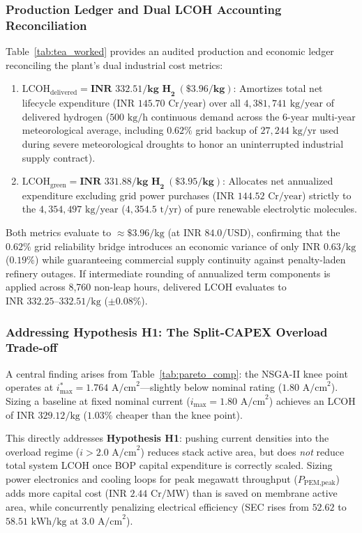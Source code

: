 \documentclass[conference]{IEEEtran}
\begin{document}
\subsubsection{Production Ledger and Dual LCOH Accounting Reconciliation}
Table~\ref{tab:tea_worked} provides an audited production and economic ledger reconciling the plant's dual industrial cost metrics:
\begin{enumerate}
    \item $\text{LCOH}_{\text{delivered}} = \mathbf{\text{INR } 332.51/\text{kg H}_2}\ (\mathbf{\$3.96/\text{kg}})$: Amortizes total net lifecycle expenditure ($\text{INR } 145.70\text{ Cr/year}$) over all $4,381,741\text{ kg/year}$ of delivered hydrogen ($500\text{ kg/h}$ continuous demand across the 6-year multi-year meteorological average, including $0.62\%$ grid backup of $27,244\text{ kg/yr}$ used during severe meteorological droughts to honor an uninterrupted industrial supply contract).
    \item $\text{LCOH}_{\text{green}} = \mathbf{\text{INR } 331.88/\text{kg H}_2}\ (\mathbf{\$3.95/\text{kg}})$: Allocates net annualized expenditure excluding grid power purchases ($\text{INR } 144.52\text{ Cr/year}$) strictly to the $4,354,497\text{ kg/year}$ ($4,354.5\text{ t/yr}$) of pure renewable electrolytic molecules.
\end{enumerate}
Both metrics evaluate to $\approx \$3.96/\text{kg}$ (at $\text{INR } 84.0/\text{USD}$), confirming that the $0.62\%$ grid reliability bridge introduces an economic variance of only $\text{INR } 0.63/\text{kg}$ ($0.19\%$) while guaranteeing commercial supply continuity against penalty-laden refinery outages. If intermediate rounding of annualized term components is applied across 8,760 non-leap hours, delivered LCOH evaluates to $\text{INR } 332.25\text{--}332.51/\text{kg}$ ($\pm 0.08\%$).

\subsubsection{Addressing Hypothesis H1: The Split-CAPEX Overload Trade-off}
A central finding arises from Table~\ref{tab:pareto_comp}: the NSGA-II knee point operates at $i_{\max}^* = 1.764\text{ A/cm}^2$---slightly below nominal rating ($1.80\text{ A/cm}^2$). Sizing a baseline at fixed nominal current ($i_{\max} = 1.80\text{ A/cm}^2$) achieves an LCOH of $\text{INR } 329.12/\text{kg}$ ($1.03\%$ cheaper than the knee point). 

This directly addresses \textbf{Hypothesis H1}: pushing current densities into the overload regime ($i > 2.0\text{ A/cm}^2$) reduces stack active area, but does \textit{not} reduce total system LCOH once BOP capital expenditure is correctly scaled. Sizing power electronics and cooling loops for peak megawatt throughput ($P_{\text{PEM,peak}}$) adds more capital cost ($\text{INR } 2.44\text{ Cr/MW}$) than is saved on membrane active area, while concurrently penalizing electrical efficiency (SEC rises from $52.62$ to $58.51\text{ kWh/kg}$ at $3.0\text{ A/cm}^2$).
\end{document}
